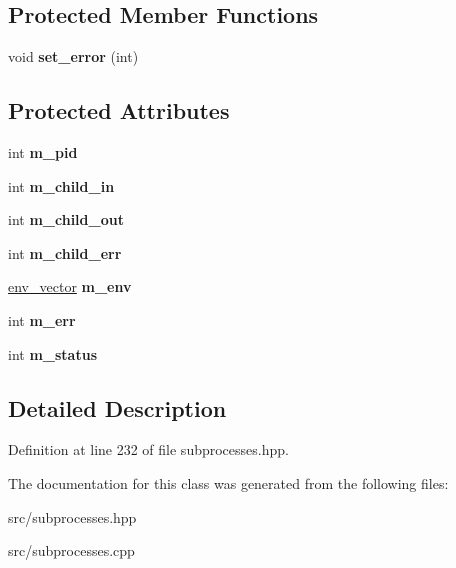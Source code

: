 \subsection*{Protected Member Functions}
\begin{DoxyCompactItemize}
\item 
void {\bfseries set\+\_\+error} (int)\hypertarget{classstlplus_1_1async__subprocess_a5f971fd2f96a941ff17ced3d83ff080f}{}\label{classstlplus_1_1async__subprocess_a5f971fd2f96a941ff17ced3d83ff080f}

\end{DoxyCompactItemize}
\subsection*{Protected Attributes}
\begin{DoxyCompactItemize}
\item 
int {\bfseries m\+\_\+pid}\hypertarget{classstlplus_1_1async__subprocess_a2d2fc610ed733e7ab279c602976fdcf0}{}\label{classstlplus_1_1async__subprocess_a2d2fc610ed733e7ab279c602976fdcf0}

\item 
int {\bfseries m\+\_\+child\+\_\+in}\hypertarget{classstlplus_1_1async__subprocess_a715c02b72ed21e4632fa169ad4818c4c}{}\label{classstlplus_1_1async__subprocess_a715c02b72ed21e4632fa169ad4818c4c}

\item 
int {\bfseries m\+\_\+child\+\_\+out}\hypertarget{classstlplus_1_1async__subprocess_a7670937f3ddd827fed2d5e2670fd3183}{}\label{classstlplus_1_1async__subprocess_a7670937f3ddd827fed2d5e2670fd3183}

\item 
int {\bfseries m\+\_\+child\+\_\+err}\hypertarget{classstlplus_1_1async__subprocess_a62d641dbd08e09d3d0320099d844b44d}{}\label{classstlplus_1_1async__subprocess_a62d641dbd08e09d3d0320099d844b44d}

\item 
\hyperlink{classstlplus_1_1env__vector}{env\+\_\+vector} {\bfseries m\+\_\+env}\hypertarget{classstlplus_1_1async__subprocess_ac5f31e405ad9e1c15dfa73d1f8d70f44}{}\label{classstlplus_1_1async__subprocess_ac5f31e405ad9e1c15dfa73d1f8d70f44}

\item 
int {\bfseries m\+\_\+err}\hypertarget{classstlplus_1_1async__subprocess_a9befb027a59652700db2095472355c3b}{}\label{classstlplus_1_1async__subprocess_a9befb027a59652700db2095472355c3b}

\item 
int {\bfseries m\+\_\+status}\hypertarget{classstlplus_1_1async__subprocess_a0db0f811c9b4830ab09b776fc717b83f}{}\label{classstlplus_1_1async__subprocess_a0db0f811c9b4830ab09b776fc717b83f}

\end{DoxyCompactItemize}


\subsection{Detailed Description}


Definition at line 232 of file subprocesses.\+hpp.



The documentation for this class was generated from the following files\+:\begin{DoxyCompactItemize}
\item 
src/subprocesses.\+hpp\item 
src/subprocesses.\+cpp\end{DoxyCompactItemize}
